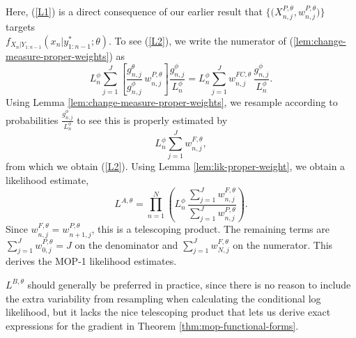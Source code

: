 Here, (\ref{L1}) is a direct consequence of our earlier result that $\{ \big(X^{P,\theta}_{n,j},w^{P,\theta}_{n,j}\big) \}$ targets\\
$f_{X_{n}|Y_{1:n-1}}(x_{n}|y^*_{1:n-1};\theta)$.
To see  (\ref{L2}),
we write the numerator of (\ref{lem:change-measure-proper-weights}) as
\begin{equation}
L^\phi_n \sum_{j=1}^J \left[ \frac{g^\theta_{n,j}}{g^\phi_{n,j}} \, w^{P,\theta}_{n,j}\right] \frac{g^\phi_{n,j}}{L_n^\phi}
= L^\phi_n \sum_{j=1}^J w_{n,j}^{FC,\theta} \, \frac{g^\phi_{n,j}}{L_n^\phi}.
\end{equation}
Using Lemma \ref{lem:change-measure-proper-weights}, we resample according to probabilities $\frac{g^\phi_{n,j}}{L_n^\phi}$ to see this is properly estimated by
\begin{equation}
L^\phi_n \sum_{j=1}^J w^{F,\theta}_{n,j},
\end{equation}
from which we obtain (\ref{L2}).
Using Lemma \ref{lem:lik-proper-weight}, we obtain a likelihood estimate,
\begin{equation}
L^{A,\theta} = \prod_{n=1}^N \left( L^\phi_n \, \frac{\sum_{j=1}^J w^{F,\theta}_{n,j}}{\sum_{j=1}^J w^{P,\theta}_{n,j}}\right).
\end{equation}
Since $w^{F,\theta}_{n,j}=w^{P,\theta}_{n+1,j}$, this is a telescoping product. The remaining terms are
$\sum_{j=1}^J w^{P,\theta}_{0,j} = J$ on the denominator and $\sum_{j=1}^J w^{F,\theta}_{N,j}$ on the numerator.
This derives the MOP-1 likelihood estimates.


$L^{B,\theta}$ should generally be preferred in practice, since there is no reason to include the extra variability from resampling when calculating the conditional log likelihood, but it lacks the nice telescoping product that lets us derive exact expressions for the gradient in Theorem \ref{thm:mop-functional-forms}.
